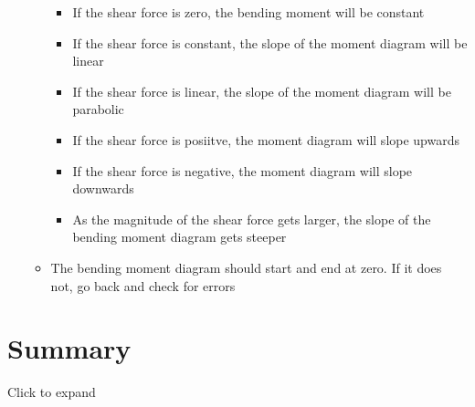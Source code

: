 \documentclass[
  letterpaper,
  DIV=11,
  numbers=noendperiod]{scrreprt}
\theoremstyle{definition}
\theoremstyle{remark}
\begin{document}
\begin{tcolorbox}
\begin{enumerate}
\begin{itemize}
    \begin{itemize}
    \item
      If the shear force is zero, the bending moment will be constant
    \item
      If the shear force is constant, the slope of the moment diagram
      will be linear
    \item
      If the shear force is linear, the slope of the moment diagram will
      be parabolic
    \item
      If the shear force is posiitve, the moment diagram will slope
      upwards
    \item
      If the shear force is negative, the moment diagram will slope
      downwards
    \item
      As the magnitude of the shear force gets larger, the slope of the
      bending moment diagram gets steeper
    \end{itemize}
  \item
    The bending moment diagram should start and end at zero. If it does
    not, go back and check for errors
  \end{itemize}
\end{enumerate}

\end{tcolorbox}

\section*{Summary}\label{summary-6}


Click to expand
\end{document}
